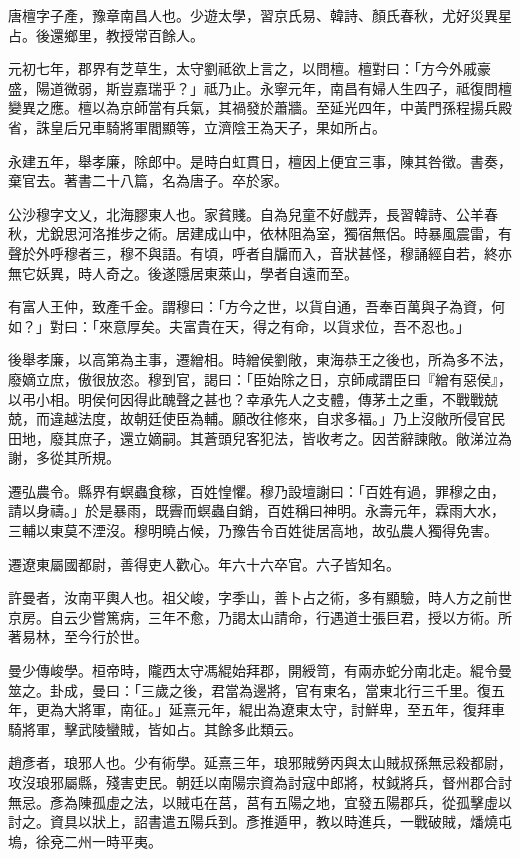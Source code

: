 
\begin{pinyinscope}
唐檀字子產，豫章南昌人也。少遊太學，習京氏易、韓詩、顏氏春秋，尤好災異星占。後還鄉里，教授常百餘人。

元初七年，郡界有芝草生，太守劉祗欲上言之，以問檀。檀對曰：「方今外戚豪盛，陽道微弱，斯豈嘉瑞乎？」祗乃止。永寧元年，南昌有婦人生四子，祗復問檀變異之應。檀以為京師當有兵氣，其禍發於蕭牆。至延光四年，中黃門孫程揚兵殿省，誅皇后兄車騎將軍閻顯等，立濟陰王為天子，果如所占。

永建五年，舉孝廉，除郎中。是時白虹貫日，檀因上便宜三事，陳其咎徵。書奏，棄官去。著書二十八篇，名為唐子。卒於家。

公沙穆字文乂，北海膠東人也。家貧賤。自為兒童不好戲弄，長習韓詩、公羊春秋，尤銳思河洛推步之術。居建成山中，依林阻為室，獨宿無侶。時暴風震雷，有聲於外呼穆者三，穆不與語。有頃，呼者自牖而入，音狀甚怪，穆誦經自若，終亦無它妖異，時人奇之。後遂隱居東萊山，學者自遠而至。

有富人王仲，致產千金。謂穆曰：「方今之世，以貨自通，吾奉百萬與子為資，何如？」對曰：「來意厚矣。夫富貴在天，得之有命，以貨求位，吾不忍也。」

後舉孝廉，以高第為主事，遷繒相。時繒侯劉敞，東海恭王之後也，所為多不法，廢嫡立庶，傲很放恣。穆到官，謁曰：「臣始除之日，京師咸謂臣曰『繒有惡侯』，以弔小相。明侯何因得此醜聲之甚也？幸承先人之支體，傳茅土之重，不戰戰兢兢，而違越法度，故朝廷使臣為輔。願改往修來，自求多福。」乃上沒敞所侵官民田地，廢其庶子，還立嫡嗣。其蒼頭兒客犯法，皆收考之。因苦辭諫敞。敞涕泣為謝，多從其所規。

遷弘農令。縣界有螟蟲食稼，百姓惶懼。穆乃設壇謝曰：「百姓有過，罪穆之由，請以身禱。」於是暴雨，既霽而螟蟲自銷，百姓稱曰神明。永壽元年，霖雨大水，三輔以東莫不湮沒。穆明曉占候，乃豫告令百姓徙居高地，故弘農人獨得免害。

遷遼東屬國都尉，善得吏人歡心。年六十六卒官。六子皆知名。

許曼者，汝南平輿人也。祖父峻，字季山，善卜占之術，多有顯驗，時人方之前世京房。自云少嘗篤病，三年不愈，乃謁太山請命，行遇道士張巨君，授以方術。所著易林，至今行於世。

曼少傳峻學。桓帝時，隴西太守馮緄始拜郡，開綬笥，有兩赤蛇分南北走。緄令曼筮之。卦成，曼曰：「三歲之後，君當為邊將，官有東名，當東北行三千里。復五年，更為大將軍，南征。」延熹元年，緄出為遼東太守，討鮮卑，至五年，復拜車騎將軍，擊武陵蠻賊，皆如占。其餘多此類云。

趙彥者，琅邪人也。少有術學。延熹三年，琅邪賊勞丙與太山賊叔孫無忌殺都尉，攻沒琅邪屬縣，殘害吏民。朝廷以南陽宗資為討寇中郎將，杖鉞將兵，督州郡合討無忌。彥為陳孤虛之法，以賊屯在莒，莒有五陽之地，宜發五陽郡兵，從孤擊虛以討之。資具以狀上，詔書遣五陽兵到。彥推遁甲，教以時進兵，一戰破賊，燔燒屯塢，徐兗二州一時平夷。


\end{pinyinscope}
